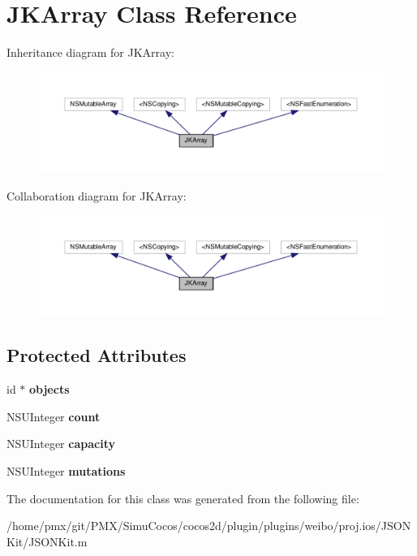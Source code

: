 \hypertarget{interfaceJKArray}{}\section{J\+K\+Array Class Reference}
\label{interfaceJKArray}


Inheritance diagram for J\+K\+Array\+:
\nopagebreak
\begin{figure}[H]
\begin{center}
\leavevmode
\includegraphics[width=350pt]{interfaceJKArray__inherit__graph}
\end{center}
\end{figure}


Collaboration diagram for J\+K\+Array\+:
\nopagebreak
\begin{figure}[H]
\begin{center}
\leavevmode
\includegraphics[width=350pt]{interfaceJKArray__coll__graph}
\end{center}
\end{figure}
\subsection*{Protected Attributes}
\begin{DoxyCompactItemize}
\item 
\mbox{\label{interfaceJKArray_a26bec99d019d3ec883d849986e2c3ef9}} 
id $\ast$ {\bfseries objects}
\item 
\mbox{\label{interfaceJKArray_a903336bb8564dd3b732b4a0aab7dfb48}} 
N\+S\+U\+Integer {\bfseries count}
\item 
\mbox{\label{interfaceJKArray_a74b14ae533a3004ac5eef33d06c59470}} 
N\+S\+U\+Integer {\bfseries capacity}
\item 
\mbox{\label{interfaceJKArray_af5ad2eeccbca0b4203feb674a975aaf4}} 
N\+S\+U\+Integer {\bfseries mutations}
\end{DoxyCompactItemize}


The documentation for this class was generated from the following file\+:\begin{DoxyCompactItemize}
\item 
/home/pmx/git/\+P\+M\+X/\+Simu\+Cocos/cocos2d/plugin/plugins/weibo/proj.\+ios/\+J\+S\+O\+N\+Kit/J\+S\+O\+N\+Kit.\+m\end{DoxyCompactItemize}
